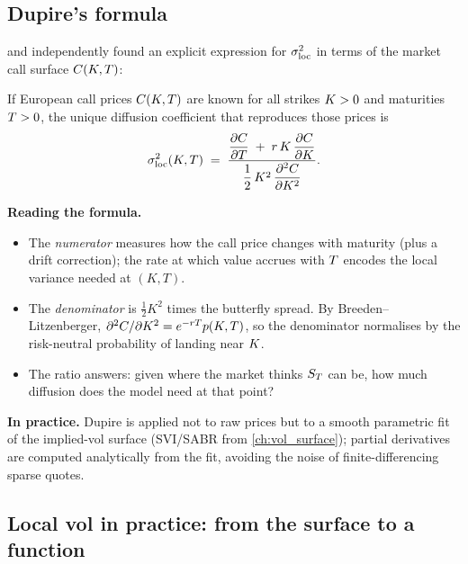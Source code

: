 \subsection{Dupire's formula}
\label{subsec:dupire_formula}

\citet{dupire1994pricing} and \citet{derman1994riding} independently
found an explicit expression for $\sigma_{\text{loc}}^2$ in terms of
the market call surface $C(K, T)$:

\begin{keyfactbox}
\label{fact:dupire}
If European call prices $C(K,T)$ are known for all
strikes $K > 0$ and maturities $T > 0$, the unique
diffusion coefficient that reproduces those prices is
\begin{equation}
  \sigma_{\text{loc}}^2(K,T)
  \;=\;
  \frac{\dfrac{\partial C}{\partial T}
        \;+\; r\,K\,\dfrac{\partial C}{\partial K}}
       {\dfrac{1}{2}\,K^2\,
        \dfrac{\partial^2 C}{\partial K^2}}.
  \label{eq:dupire}
\end{equation}
\end{keyfactbox}

\noindent
\textbf{Reading the formula.}
\begin{itemize}
  \item The \emph{numerator} measures how the call price changes with
    maturity (plus a drift correction); the rate at which value
    accrues with $T$ encodes the local variance needed at $(K,T)$.
  \item The \emph{denominator} is $\tfrac12 K^2$ times the butterfly
    spread. By Breeden--Litzenberger, $\partial^2C/\partial
    K^2 = e^{-rT}p(K,T)$, so the denominator
    normalises by the risk-neutral probability of landing near
    $K$.
  \item The ratio answers: given where the market thinks
    $S_T$ can be, how much diffusion does the model need at
    that point?
\end{itemize}

\noindent
\textbf{In practice.} Dupire is applied not to raw prices but to a
smooth parametric fit of the implied-vol surface (SVI/SABR from
\cref{ch:vol_surface}); partial derivatives are computed analytically
from the fit, avoiding the noise of finite-differencing sparse quotes.

\subsection{Local vol in practice: from the surface to a function}
\label{subsec:local_vol_practice}

